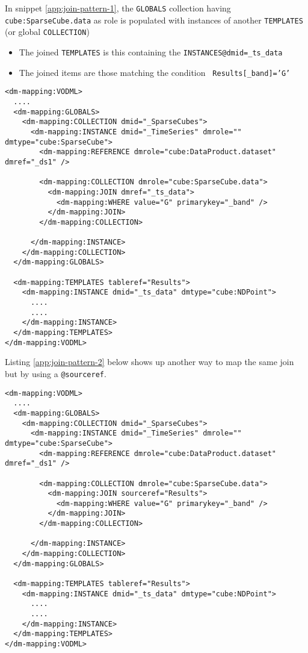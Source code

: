 
In snippet \ref{app:join-pattern-1}, the \texttt{GLOBALS} collection having \texttt{cube:SparseCube.data} as role is populated with  instances of another \texttt{TEMPLATES} (or global \texttt{COLLECTION})
\begin{itemize}
  \item The joined \texttt{TEMPLATES} is this containing the  \texttt{INSTANCES@dmid=\_ts\_data}
  \item The joined items are those matching the condition  \texttt{ Results[\_band]='G'}
\end{itemize}

\begin{lstlisting}[frame=single,label={app:join-pattern-1},caption={Joining a global COLLECTION with a TEMPLATES  identified by a @dmid/@dmref pair},style=XML,basicstyle=\tiny]
<dm-mapping:VODML>
  ....
  <dm-mapping:GLOBALS>
    <dm-mapping:COLLECTION dmid="_SparseCubes">
      <dm-mapping:INSTANCE dmid="_TimeSeries" dmrole="" dmtype="cube:SparseCube">
        <dm-mapping:REFERENCE dmrole="cube:DataProduct.dataset" dmref="_ds1" />
        
        <dm-mapping:COLLECTION dmrole="cube:SparseCube.data">
          <dm-mapping:JOIN dmref="_ts_data">
            <dm-mapping:WHERE value="G" primarykey="_band" />
          </dm-mapping:JOIN>
        </dm-mapping:COLLECTION>
        
      </dm-mapping:INSTANCE>
    </dm-mapping:COLLECTION>
  </dm-mapping:GLOBALS>

  <dm-mapping:TEMPLATES tableref="Results">
    <dm-mapping:INSTANCE dmid="_ts_data" dmtype="cube:NDPoint">
      ....
      ....
    </dm-mapping:INSTANCE>
  </dm-mapping:TEMPLATES>
</dm-mapping:VODML>
\end{lstlisting}  

Listing \ref{app:join-pattern-2} below shows up another way to map the same join but by using a \texttt{@sourceref}.

\begin{lstlisting}[frame=single,label={app:join-pattern-2},caption={Joining a global COLLECTION with a TEMPLATES  identified by a @sourceref},style=XML,basicstyle=\tiny]
<dm-mapping:VODML>
  ....
  <dm-mapping:GLOBALS>
    <dm-mapping:COLLECTION dmid="_SparseCubes">
      <dm-mapping:INSTANCE dmid="_TimeSeries" dmrole="" dmtype="cube:SparseCube">
        <dm-mapping:REFERENCE dmrole="cube:DataProduct.dataset" dmref="_ds1" />
        
        <dm-mapping:COLLECTION dmrole="cube:SparseCube.data">
          <dm-mapping:JOIN sourceref="Results">
            <dm-mapping:WHERE value="G" primarykey="_band" />
          </dm-mapping:JOIN>
        </dm-mapping:COLLECTION>
        
      </dm-mapping:INSTANCE>
    </dm-mapping:COLLECTION>
  </dm-mapping:GLOBALS>

  <dm-mapping:TEMPLATES tableref="Results">
    <dm-mapping:INSTANCE dmid="_ts_data" dmtype="cube:NDPoint">
      ....
      ....
    </dm-mapping:INSTANCE>
  </dm-mapping:TEMPLATES>
</dm-mapping:VODML>
\end{lstlisting}  

